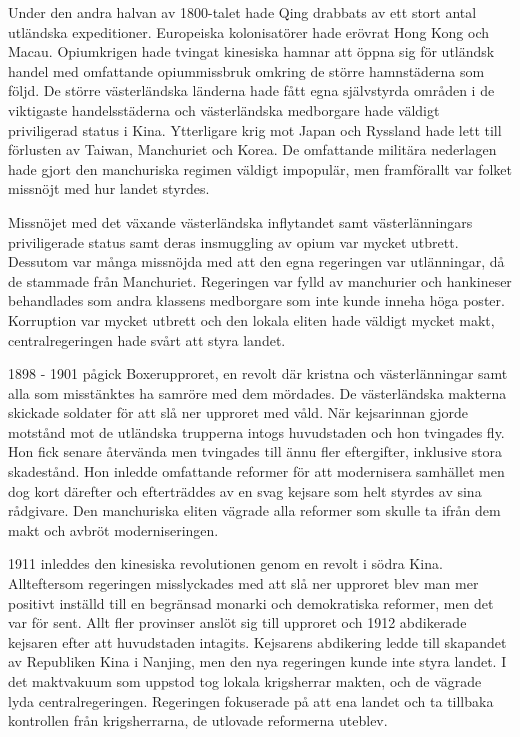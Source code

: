 \documentclass[a4paper,10pt]{article}
\begin{document}
Under den andra halvan av 1800-talet hade Qing drabbats av ett stort antal utländska expeditioner. Europeiska kolonisatörer hade erövrat Hong Kong och Macau. Opiumkrigen hade tvingat kinesiska hamnar att öppna sig för utländsk handel med omfattande opiummissbruk omkring de större hamnstäderna som följd. De större västerländska länderna hade fått egna självstyrda områden i de viktigaste handelsstäderna och västerländska medborgare hade väldigt priviligerad status i Kina. Ytterligare krig mot Japan och Ryssland hade lett till förlusten av Taiwan, Manchuriet och Korea. De omfattande militära nederlagen hade gjort den manchuriska regimen väldigt impopulär, men framförallt var folket missnöjt med hur landet styrdes. 

Missnöjet med det växande västerländska inflytandet samt västerlänningars priviligerade status samt deras insmuggling av opium var mycket utbrett. Dessutom var många missnöjda med att den egna regeringen var utlänningar, då de stammade från Manchuriet. Regeringen var fylld av manchurier och hankineser behandlades som andra klassens medborgare som inte kunde inneha höga poster. Korruption var mycket utbrett och den lokala eliten hade väldigt mycket makt, centralregeringen hade svårt att styra landet. 

1898 - 1901 pågick Boxerupproret, en revolt där kristna och västerlänningar samt alla som misstänktes ha samröre med dem mördades. De västerländska makterna skickade soldater för att slå ner upproret med våld. När kejsarinnan gjorde motstånd mot de utländska trupperna intogs huvudstaden och hon tvingades fly. Hon fick senare återvända men tvingades till ännu fler eftergifter, inklusive stora skadestånd. Hon inledde omfattande reformer för att modernisera samhället men dog kort därefter och efterträddes av en svag kejsare som helt styrdes av sina rådgivare. Den manchuriska eliten vägrade alla reformer som skulle ta ifrån dem makt och avbröt moderniseringen.

1911 inleddes den kinesiska revolutionen genom en revolt i södra Kina. Allteftersom regeringen misslyckades med att slå ner upproret blev man mer positivt inställd till en begränsad monarki och demokratiska reformer, men det var för sent. Allt fler provinser anslöt sig till upproret och 1912 abdikerade kejsaren efter att huvudstaden intagits. Kejsarens abdikering ledde till skapandet av Republiken Kina i Nanjing, men den nya regeringen kunde inte styra landet. I det maktvakuum som uppstod tog lokala krigsherrar makten, och de vägrade lyda centralregeringen. Regeringen fokuserade på att ena landet och ta tillbaka kontrollen från krigsherrarna, de utlovade reformerna uteblev.
\end{document}
